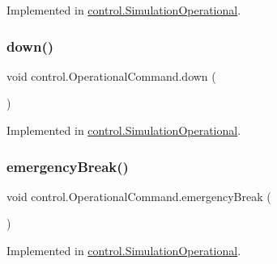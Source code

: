 Implemented in \mbox{\hyperlink{classcontrol_1_1_simulation_operational_a66881a9f2cf8526dee93b756f8ad47af}{control.\+Simulation\+Operational}}.

\mbox{\label{interfacecontrol_1_1_operational_command_a3d1ecf1ec7ad55a3f3e02d2fc9df7e18}} 
\subsubsection{\texorpdfstring{down()}{down()}}
{\footnotesize\ttfamily void control.\+Operational\+Command.\+down (\begin{DoxyParamCaption}{ }\end{DoxyParamCaption})}



Implemented in \mbox{\hyperlink{classcontrol_1_1_simulation_operational_a67c7dc0ec1b837a8174d127cb6803eb9}{control.\+Simulation\+Operational}}.

\mbox{\label{interfacecontrol_1_1_operational_command_a63858b26e71770bb4ae232277d54b8a6}} 
\subsubsection{\texorpdfstring{emergencyBreak()}{emergencyBreak()}}
{\footnotesize\ttfamily void control.\+Operational\+Command.\+emergency\+Break (\begin{DoxyParamCaption}{ }\end{DoxyParamCaption})}



Implemented in \mbox{\hyperlink{classcontrol_1_1_simulation_operational_a1d385c1f369eb3aff538c36b5947f8ed}{control.\+Simulation\+Operational}}.

\mbox{\label{interfacecontrol_1_1_operational_command_a148c09334384843727fb7b1665252ff1}} 
